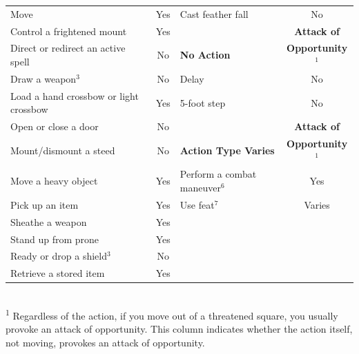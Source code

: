 \begin{table}[]
\begin{tabular}{lclc}
Move                                             & Yes                   & Cast feather fall                         & No                    \\
Control a frightened mount                       & Yes                   &                                           & \textbf{Attack of}    \\
Direct or redirect an active spell               & No                    & \textbf{No Action}                        & \textbf{Opportunity\(^{1}\)} \\
Draw a weapon\(^{3}\)                            & No                    & Delay                                     & No                    \\
Load a hand crossbow or light crossbow           & Yes                   & 5-foot step                               & No                    \\
Open or close a door                             & No                    &                                           & \textbf{Attack of}    \\
Mount/dismount a steed                           & No                    & \textbf{Action Type Varies}               & \textbf{Opportunity\(^{1}\)} \\
Move a heavy object                              & Yes                   & Perform a combat maneuver\(^{6}\)         & Yes                   \\
Pick up an item                                  & Yes                   & Use feat\(^{7}\)                          & Varies                \\
Sheathe a weapon                                 & Yes                   &                                           &                       \\
Stand up from prone                              & Yes                   &                                           &                       \\
Ready or drop a shield\(^{3}\)                   & No                    &                                           &                       \\
Retrieve a stored item                           & Yes                   &                                           &                      \\
\end{tabular}\\
\textsuperscript{1} Regardless of the action, if you move out of a threatened square, you usually provoke an attack of opportunity. This column indicates whether the action itself, not moving, provokes an attack of opportunity.\newline

\end{table}
